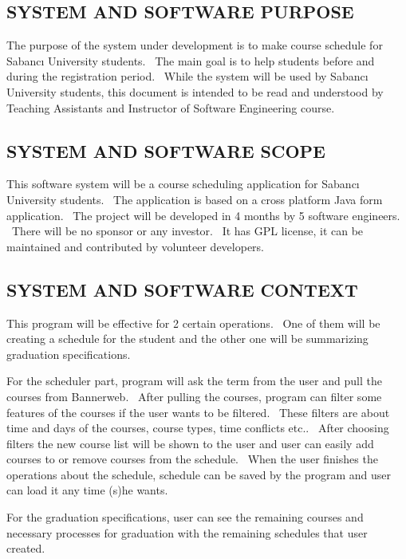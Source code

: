 \documentclass[twoside,letterpaper]{article}
\begin{document}
\subsection{SYSTEM AND SOFTWARE PURPOSE}

The purpose of the system under development is to make course schedule for Sabanc\i{} University students. \ The main goal is to help students before and during the registration period. \ While the system will be used by Sabanc{\i} University students,
this document is intended to be read and understood by Teaching Assistants and Instructor of Software Engineering course.

\subsection{SYSTEM AND SOFTWARE SCOPE}

This software system will be a course scheduling application for Sabanc\i{} University students. \ The application is based on a cross platform Java form application. \ The project will be developed in 4 months by 5 software engineers. \ There will be no sponsor or any investor. \ It has GPL license, it can be maintained and contributed by volunteer developers.

\subsection{SYSTEM AND SOFTWARE CONTEXT}

This program will be effective for 2 certain operations. \ One of them will be creating a schedule for the student and the other one will be summarizing graduation specifications.
\bigskip

\noindent
For the scheduler part, program will ask the term from the user and pull the courses from Bannerweb. \ After pulling the courses, program can filter some features of the courses if the user wants to be filtered. \ These filters are about time and days of the courses, course types, time conflicts etc.. \ After choosing filters the new course list will be shown to the user and user can easily add courses to or remove courses from the schedule. \ When the user finishes the operations about the schedule, schedule can be saved by the program and user can load it any time (s)he wants.
\bigskip

\noindent
For the graduation specifications, user can see the remaining courses and necessary processes for graduation with the remaining schedules that user created.
\end{document}
